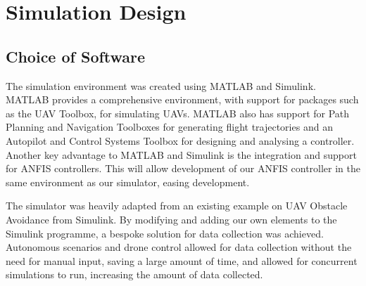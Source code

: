 \chapter{Simulation Design}
\section{Choice of Software}
The simulation environment was created using MATLAB and Simulink. MATLAB provides a comprehensive environment, with support for packages such as the UAV Toolbox, for simulating UAVs. MATLAB also has support for Path Planning and Navigation Toolboxes for generating flight trajectories and an Autopilot and Control Systems Toolbox for designing and analysing a controller. Another key advantage to MATLAB and Simulink is the integration and support for ANFIS controllers. This will allow development of our ANFIS controller in the same environment as our simulator, easing development. 

The simulator was heavily adapted from an existing example on UAV Obstacle Avoidance from Simulink. By modifying and adding our own elements to the Simulink programme, a bespoke solution for data collection was achieved. Autonomous scenarios and drone control allowed for data collection without the need for manual input, saving a large amount of time, and allowed for concurrent simulations to run, increasing the amount of data collected.
